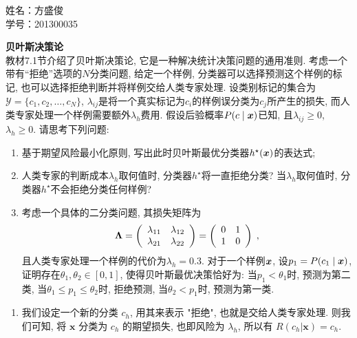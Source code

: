 \documentclass[answers]{exam}  %
\begin{document}
\noindent
姓名：方盛俊 \\
学号：201300035 \\
\begin{questions}
  \question [20] \textbf{贝叶斯决策论} \\
  教材7.1节介绍了贝叶斯决策论, 它是一种解决统计决策问题的通用准则. 考虑一个带有“拒绝”选项的$N$分类问题, 给定一个样例, 分类器可以选择预测这个样例的标记, 也可以选择拒绝判断并将样例交给人类专家处理. 设类别标记的集合为$\mathcal{Y}=\{c_1,c_2,\ldots,c_N\}$, $\lambda_{ij}$是将一个真实标记为$c_i$的样例误分类为$c_j$所产生的损失, 而人类专家处理一个样例需要额外$\lambda_{h}$费用. 假设后验概率$P(c\mid{\boldsymbol{x}})$已知, 且$\lambda_{ij}\geq 0$, $\lambda_{h}\geq 0$. 请思考下列问题:
  \begin{enumerate}
    \item 基于期望风险最小化原则, 写出此时贝叶斯最优分类器$h^\star({\boldsymbol{x}})$的表达式;
    \item 人类专家的判断成本$\lambda_{h}$取何值时, 分类器$h^\star$将一直拒绝分类? 当$\lambda_{h}$取何值时, 分类器$h^\star$不会拒绝分类任何样例?
    \item 考虑一个具体的二分类问题, 其损失矩阵为
          \begin{equation}
            \boldsymbol{\Lambda}=\left(\begin{array}{cc}
                \lambda_{11} & \lambda_{12} \\
                \lambda_{21} & \lambda_{22}\end{array}\right)=\left(\begin{array}{cc}
                0 & 1 \\
                1 & 0\end{array}\right)\;,
            \label{ch7_eq:cost_matrix}
          \end{equation}
          且人类专家处理一个样例的代价为$\lambda_{h}=0.3$. 对于一个样例${\boldsymbol{x}}$, 设$p_1=P(c_1\mid{\boldsymbol{x}})$, 证明存在$\theta_1,\theta_2\in[0,1]$, 使得贝叶斯最优决策恰好为: 当$p_1<\theta_1$时, 预测为第二类, 当$\theta_1\leq p_1\leq \theta_2$时, 拒绝预测, 当$\theta_2<p_1$时, 预测为第一类.
  \end{enumerate}

  \begin{solution}
    \begin{enumerate}
      \item

            我们设定一个新的分类 $c_h$, 用其来表示 "拒绝", 也就是交给人类专家处理. 则我们可知, 将 $\bm{x}$ 分类为 $c_h$ 的期望损失, 也即风险为 $\lambda_h$, 所以有 $R(c_h|\bm{x}) = c_h$.


\end{enumerate}
\end{solution}
\end{questions}
\end{document}
